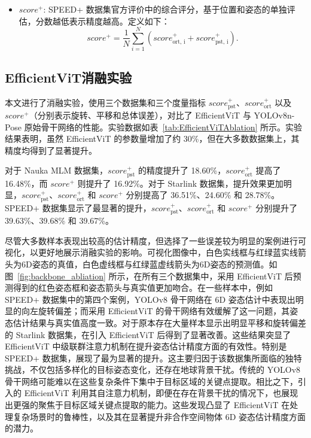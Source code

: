 \begin{itemize}
	\item $score^+$: SPEED+ 数据集官方评价中的综合评分，基于位置和姿态的单独评估，分数越低表示精度越高。定义如下：
	\begin{equation}
		score^+ = \frac{1}{N}\sum\limits_{i=1}^N(score_{\text{ort, i}}^+ + score_{\text{pst, i}}^+).
	\end{equation}
	
\end{itemize}




\subsection{EfficientViT消融实验}
本文进行了消融实验，使用三个数据集和三个度量指标 $score_{\text{pst}}^+$、$score_{\text{ort}}^+$ 以及 $score^+$（分别表示旋转、平移和总体误差），对比了 EfficientViT 与 YOLOv8n-Pose 原始骨干网络的性能。实验数据如表~\ref{tab:EfficientViTAblation} 所示。实验结果表明，虽然 EfficientViT 的参数量增加了约 30\%，但在大多数数据集上，其精度均得到了显著提升。

对于 Nauka MLM 数据集，$score_{\text{pst}}^+$ 的精度提升了 18.60\%，$score_{\text{ort}}^+$ 提高了 16.48\%，而 $score^+$ 则提升了 16.92\%。对于 Starlink 数据集，提升效果更加明显，$score_{\text{pst}}^+$、$score_{\text{ort}}^+$ 和 $score^+$ 分别提高了 36.51\%、24.60\% 和 28.78\%。SPEED+ 数据集显示了最显著的提升，$score_{\text{pst}}^+$、$score_{\text{ort}}^+$ 和 $score^+$ 分别提升了 39.63\%、39.68\% 和 39.67\%。

尽管大多数样本表现出较高的估计精度，但选择了一些误差较为明显的案例进行可视化，以更好地展示消融实验的影响。可视化图像中，白色实线框与红绿蓝实线箭头为6D姿态的真值，白色虚线框与红绿蓝虚线箭头为6D姿态的预测值。如图~\ref{fig:backbone_abliation} 所示，在所有三个数据集中，采用 EfficientViT 后预测得到的红色姿态框和姿态箭头与真实值更加吻合。在一些样本中，例如 SPEED+ 数据集中的第四个案例，YOLOv8 骨干网络在 6D 姿态估计中表现出明显的向左旋转偏差；而采用 EfficientViT 的骨干网络有效缓解了这一问题，其姿态估计结果与真实值高度一致。对于原本存在大量样本显示出明显平移和旋转偏差的 Starlink 数据集，在引入 EfficientViT 后得到了显著改善。这些结果突显了 EfficientViT 中级联群注意力机制在提升姿态估计精度方面的有效性。特别是 SPEED+ 数据集，展现了最为显著的提升。这主要归因于该数据集所面临的独特挑战，不仅包括多样化的目标姿态变化，还存在地球背景干扰。传统的 YOLOv8 骨干网络可能难以在这些复杂条件下集中于目标区域的关键点提取。相比之下，引入的 EfficientViT 利用其自注意力机制，即便在存在背景干扰的情况下，也展现出更强的聚焦于目标区域关键点提取的能力。这些发现凸显了 EfficientViT 在处理复杂场景时的鲁棒性，以及其在显著提升非合作空间物体 6D 姿态估计精度方面的潜力。

